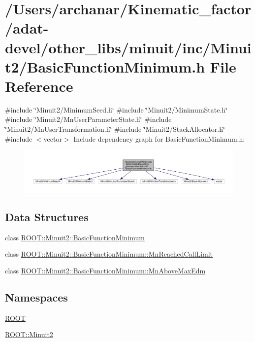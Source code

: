 \hypertarget{adat-devel_2other__libs_2minuit_2inc_2Minuit2_2BasicFunctionMinimum_8h}{}\section{/\+Users/archanar/\+Kinematic\+\_\+factor/adat-\/devel/other\+\_\+libs/minuit/inc/\+Minuit2/\+Basic\+Function\+Minimum.h File Reference}
\label{adat-devel_2other__libs_2minuit_2inc_2Minuit2_2BasicFunctionMinimum_8h}
{\ttfamily \#include \char`\"{}Minuit2/\+Minimum\+Seed.\+h\char`\"{}}\newline
{\ttfamily \#include \char`\"{}Minuit2/\+Minimum\+State.\+h\char`\"{}}\newline
{\ttfamily \#include \char`\"{}Minuit2/\+Mn\+User\+Parameter\+State.\+h\char`\"{}}\newline
{\ttfamily \#include \char`\"{}Minuit2/\+Mn\+User\+Transformation.\+h\char`\"{}}\newline
{\ttfamily \#include \char`\"{}Minuit2/\+Stack\+Allocator.\+h\char`\"{}}\newline
{\ttfamily \#include $<$vector$>$}\newline
Include dependency graph for Basic\+Function\+Minimum.\+h\+:
\nopagebreak
\begin{figure}[H]
\begin{center}
\leavevmode
\includegraphics[width=350pt]{d5/dca/adat-devel_2other__libs_2minuit_2inc_2Minuit2_2BasicFunctionMinimum_8h__incl}
\end{center}
\end{figure}
\subsection*{Data Structures}
\begin{DoxyCompactItemize}
\item 
class \mbox{\hyperlink{classROOT_1_1Minuit2_1_1BasicFunctionMinimum}{R\+O\+O\+T\+::\+Minuit2\+::\+Basic\+Function\+Minimum}}
\item 
class \mbox{\hyperlink{classROOT_1_1Minuit2_1_1BasicFunctionMinimum_1_1MnReachedCallLimit}{R\+O\+O\+T\+::\+Minuit2\+::\+Basic\+Function\+Minimum\+::\+Mn\+Reached\+Call\+Limit}}
\item 
class \mbox{\hyperlink{classROOT_1_1Minuit2_1_1BasicFunctionMinimum_1_1MnAboveMaxEdm}{R\+O\+O\+T\+::\+Minuit2\+::\+Basic\+Function\+Minimum\+::\+Mn\+Above\+Max\+Edm}}
\end{DoxyCompactItemize}
\subsection*{Namespaces}
\begin{DoxyCompactItemize}
\item 
 \mbox{\hyperlink{namespaceROOT}{R\+O\+OT}}
\item 
 \mbox{\hyperlink{namespaceROOT_1_1Minuit2}{R\+O\+O\+T\+::\+Minuit2}}
\end{DoxyCompactItemize}
